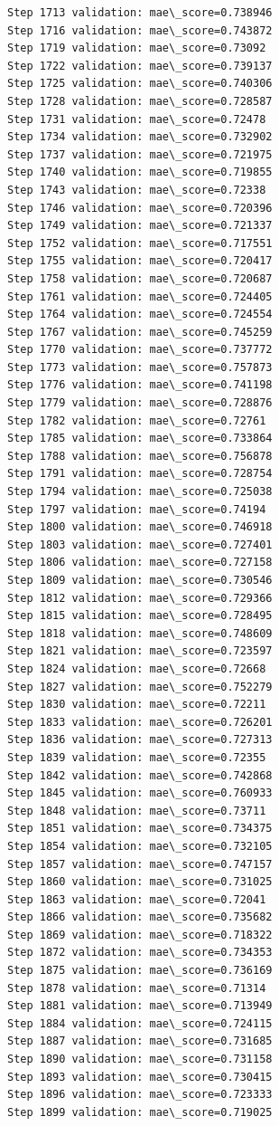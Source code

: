 \documentclass[11pt]{article}
\begin{document}
\begin{Verbatim}[commandchars=\\\{\}]
Step 1713 validation: mae\_score=0.738946
Step 1716 validation: mae\_score=0.743872
Step 1719 validation: mae\_score=0.73092
Step 1722 validation: mae\_score=0.739137
Step 1725 validation: mae\_score=0.740306
Step 1728 validation: mae\_score=0.728587
Step 1731 validation: mae\_score=0.72478
Step 1734 validation: mae\_score=0.732902
Step 1737 validation: mae\_score=0.721975
Step 1740 validation: mae\_score=0.719855
Step 1743 validation: mae\_score=0.72338
Step 1746 validation: mae\_score=0.720396
Step 1749 validation: mae\_score=0.721337
Step 1752 validation: mae\_score=0.717551
Step 1755 validation: mae\_score=0.720417
Step 1758 validation: mae\_score=0.720687
Step 1761 validation: mae\_score=0.724405
Step 1764 validation: mae\_score=0.724554
Step 1767 validation: mae\_score=0.745259
Step 1770 validation: mae\_score=0.737772
Step 1773 validation: mae\_score=0.757873
Step 1776 validation: mae\_score=0.741198
Step 1779 validation: mae\_score=0.728876
Step 1782 validation: mae\_score=0.72761
Step 1785 validation: mae\_score=0.733864
Step 1788 validation: mae\_score=0.756878
Step 1791 validation: mae\_score=0.728754
Step 1794 validation: mae\_score=0.725038
Step 1797 validation: mae\_score=0.74194
Step 1800 validation: mae\_score=0.746918
Step 1803 validation: mae\_score=0.727401
Step 1806 validation: mae\_score=0.727158
Step 1809 validation: mae\_score=0.730546
Step 1812 validation: mae\_score=0.729366
Step 1815 validation: mae\_score=0.728495
Step 1818 validation: mae\_score=0.748609
Step 1821 validation: mae\_score=0.723597
Step 1824 validation: mae\_score=0.72668
Step 1827 validation: mae\_score=0.752279
Step 1830 validation: mae\_score=0.72211
Step 1833 validation: mae\_score=0.726201
Step 1836 validation: mae\_score=0.727313
Step 1839 validation: mae\_score=0.72355
Step 1842 validation: mae\_score=0.742868
Step 1845 validation: mae\_score=0.760933
Step 1848 validation: mae\_score=0.73711
Step 1851 validation: mae\_score=0.734375
Step 1854 validation: mae\_score=0.732105
Step 1857 validation: mae\_score=0.747157
Step 1860 validation: mae\_score=0.731025
Step 1863 validation: mae\_score=0.72041
Step 1866 validation: mae\_score=0.735682
Step 1869 validation: mae\_score=0.718322
Step 1872 validation: mae\_score=0.734353
Step 1875 validation: mae\_score=0.736169
Step 1878 validation: mae\_score=0.71314
Step 1881 validation: mae\_score=0.713949
Step 1884 validation: mae\_score=0.724115
Step 1887 validation: mae\_score=0.731685
Step 1890 validation: mae\_score=0.731158
Step 1893 validation: mae\_score=0.730415
Step 1896 validation: mae\_score=0.723333
Step 1899 validation: mae\_score=0.719025

\end{Verbatim}
\end{document}

